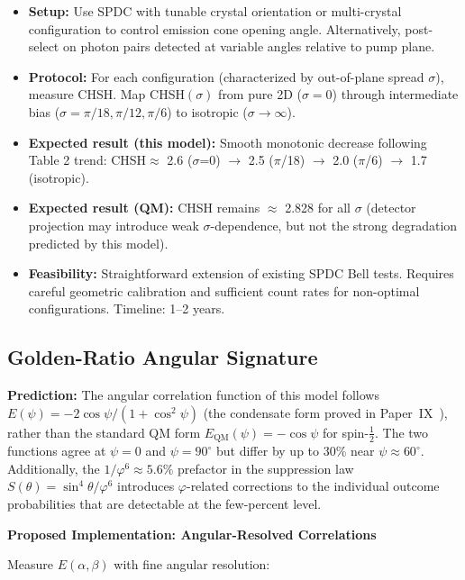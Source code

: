 \documentclass[11pt,a4paper]{article}
\theoremstyle{definition}
\theoremstyle{remark}
\newcommand{\vp}{\varphi}
\begin{document}
\begin{itemize}
\item \textbf{Setup:} Use SPDC with tunable crystal orientation or multi-crystal configuration to control emission cone opening angle. Alternatively, post-select on photon pairs detected at variable angles relative to pump plane.

\item \textbf{Protocol:} For each configuration (characterized by out-of-plane spread $\sigma$), measure CHSH. Map CHSH$(\sigma)$ from pure 2D ($\sigma = 0$) through intermediate bias ($\sigma = \pi/18, \pi/12, \pi/6$) to isotropic ($\sigma \to \infty$).

\item \textbf{Expected result (this model):} Smooth monotonic decrease following Table 2 trend: CHSH$\approx$ 2.6 ($\sigma$=0) $\to$ 2.5 ($\pi$/18) $\to$ 2.0 ($\pi$/6) $\to$ 1.7 (isotropic).

\item \textbf{Expected result (QM):} CHSH remains $\approx$ 2.828 for all $\sigma$ (detector projection may introduce weak $\sigma$-dependence, but not the strong degradation predicted by this model).

\item \textbf{Feasibility:} Straightforward extension of existing SPDC Bell tests. Requires careful geometric calibration and sufficient count rates for non-optimal configurations. Timeline: 1--2 years.
\end{itemize}

\subsection{Golden-Ratio Angular Signature}

\textbf{Prediction:} The angular correlation function of this model follows
$E(\psi) = -2\cos\psi/(1+\cos^2\!\psi)$ (the condensate form proved in
Paper~IX~\cite{Paper9}), rather than the standard QM form
$E_\mathrm{QM}(\psi) = -\cos\psi$ for spin-$\tfrac{1}{2}$.
The two functions agree at $\psi=0$ and $\psi=90^\circ$ but differ by up to
30\% near $\psi\approx60^\circ$.
Additionally, the $1/\vp^6\approx5.6\%$ prefactor in the suppression law
$S(\theta)=\sin^4\!\theta/\vp^6$ introduces $\vp$-related corrections to the
individual outcome probabilities that are detectable at the few-percent level.

\textbf{Proposed Implementation: Angular-Resolved Correlations}

Measure $E(\alpha, \beta)$ with fine angular resolution:
\end{document}
